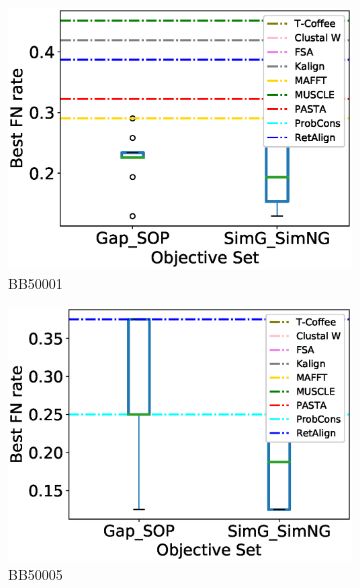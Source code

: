 \begin{figure}[!htbp]
\begin{adjustwidth}{-1.5cm}{-1cm}
		\begin{subfigure}{0.22\textwidth}
			\includegraphics[width=\columnwidth]{Figure/summary/precomputedInit/Balibase/BB50001_objset_fnrate_rank}
			\caption{BB50001}
		\end{subfigure}
		\begin{subfigure}{0.22\textwidth}
			\includegraphics[width=\columnwidth]{Figure/summary/precomputedInit/Balibase/BB50005_objset_fnrate_rank}
			\caption{BB50005}
		\end{subfigure}		
		\begin{subfigure}{0.22\textwidth}

\end{subfigure}
\end{adjustwidth}
\end{figure}
